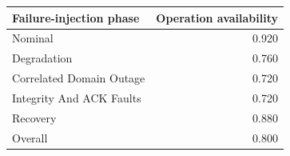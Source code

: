 \begin{tabular}{lr}
\toprule
Failure-injection phase & Operation availability \\
\midrule
Nominal & 0.920 \\
Degradation & 0.760 \\
Correlated Domain Outage & 0.720 \\
Integrity And ACK Faults & 0.720 \\
Recovery & 0.880 \\
\midrule
Overall & 0.800 \\
\bottomrule
\end{tabular}
